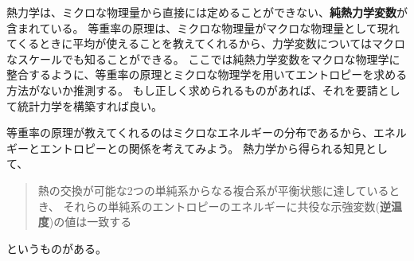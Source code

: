\documentclass[
]{ltjsbook}
\begin{document}
熱力学は、ミクロな物理量から直接には定めることができない、\textbf{純熱力学変数}が含まれている。
等重率の原理は、ミクロな物理量がマクロな物理量として現れてくるときに平均が使えることを教えてくれるから、力学変数についてはマクロなスケールでも知ることができる。
ここでは純熱力学変数をマクロな物理学に整合するように、等重率の原理とミクロな物理学を用いてエントロピーを求める方法がないか推測する。
もし正しく求められるものがあれば、それを要請として統計力学を構築すれば良い。

等重率の原理が教えてくれるのはミクロなエネルギーの分布であるから、エネルギーとエントロピーとの関係を考えてみよう。
熱力学から得られる知見として、

\begin{quote}
熱の交換が可能な2つの単純系からなる複合系が平衡状態に達しているとき、
それらの単純系のエントロピーのエネルギーに共役な示強変数(\textbf{逆温度})の値は一致する
\end{quote}

というものがある。
\end{document}
